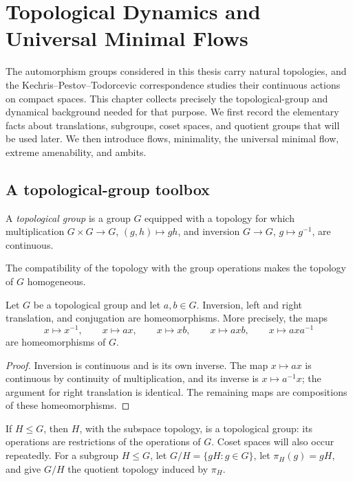 \chapter{Topological Dynamics and Universal Minimal Flows}
\label{chap:topological-dynamics}

The automorphism groups considered in this thesis carry natural topologies, and
the Kechris--Pestov--Todorcevic correspondence studies their continuous actions
on compact spaces.  This chapter collects precisely the topological-group and
dynamical background needed for that purpose.  We first record the elementary
facts about translations, subgroups, coset spaces, and quotient groups that will
be used later.  We then introduce flows, minimality, the universal minimal flow,
extreme amenability, and ambits.

\section{A topological-group toolbox}

\begin{definition}
    A \emph{topological group} is a group \(G\) equipped with a topology for
    which multiplication \(G\times G\to G\), \((g,h)\mapsto gh\), and inversion
    \(G\to G\), \(g\mapsto g^{-1}\), are continuous.
\end{definition}

The compatibility of the topology with the group operations makes the topology
of \(G\) homogeneous.

\begin{proposition}
    \label{prop:translations-homeomorphisms}
    Let \(G\) be a topological group and let \(a,b\in G\).  Inversion, left and
    right translation, and conjugation are homeomorphisms.  More precisely, the
    maps
    \[
        x\mapsto x^{-1},\qquad x\mapsto ax,\qquad x\mapsto xb,\qquad
        x\mapsto axb,\qquad x\mapsto axa^{-1}
    \]
    are homeomorphisms of \(G\).
\end{proposition}

\begin{proof}
    Inversion is continuous and is its own inverse.  The map \(x\mapsto ax\) is
    continuous by continuity of multiplication, and its inverse is
    \(x\mapsto a^{-1}x\); the argument for right translation is identical.  The
    remaining maps are compositions of these homeomorphisms.
\end{proof}

If \(H\leq G\), then \(H\), with the subspace topology, is a topological group:
its operations are restrictions of the operations of \(G\).  Coset spaces will
also occur repeatedly.  For a subgroup \(H\leq G\), let
\(G/H=\{gH:g\in G\}\), let \(\pi_H(g)=gH\), and give \(G/H\) the quotient
topology induced by \(\pi_H\).

